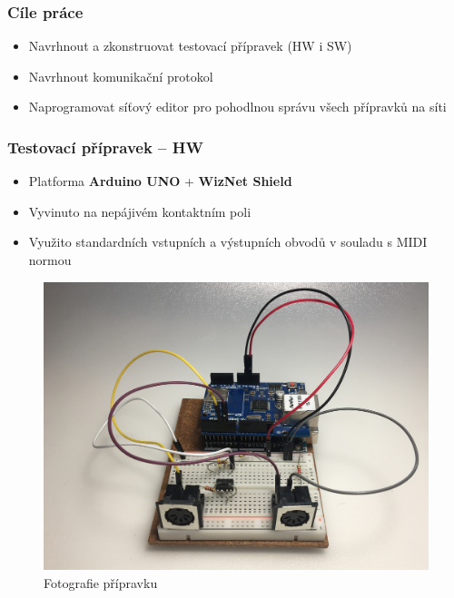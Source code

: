 \documentclass[%
  12pt,       				%
	t,                  %
	aspectratio=1610,   %
	unicode,						%
]{beamer}				    	%
\begin{document}
\disablenavigationsymbols

\maketitle

\newcommand{\bytes}[4]{
    \begin{center}
        \large{\texttt{0x#1, 0x#2, 0x#3, 0x#4}}
    \end{center}
}

\begin{frame} 
	\frametitle{Cíle práce}
	\begin{itemize}
		\item Navrhnout a zkonstruovat testovací přípravek (HW i SW)
		\item Navrhnout komunikační protokol
		\item Naprogramovat síťový editor pro pohodlnou správu všech přípravků na síti
	\end{itemize}
\end{frame}

\begin{frame}
	\frametitle{Testovací přípravek -- HW}
	\begin{itemize}
		\item Platforma \textbf{Arduino UNO} + \textbf{WizNet Shield}
		\item Vyvinuto na nepájivém kontaktním poli
		\item Využito standardních vstupních a výstupních obvodů v souladu s MIDI normou
	\end{itemize}
	\begin{figure}
		\centering
		\includegraphics[height=0.4\textheight ]{obrazky/Pripravek.jpg}
		\caption{Fotografie přípravku}
	\end{figure}
\end{frame}
\end{document}
